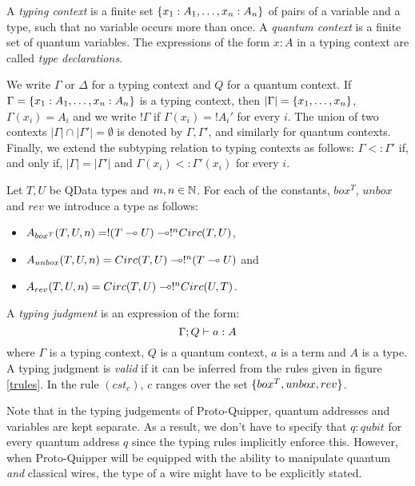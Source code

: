 \documentclass{article}
\begin{document}
\begin{definition}
A \emph{typing context} is a finite set 
$\{x_1:A_1,\ldots,x_n:A_n\}$ of pairs of a variable and 
a type, such that no variable occurs more than once. A 
\emph{quantum context} is a finite set of quantum variables. 
The expressions of the form $x:A$ in a typing context are 
called \emph{type declarations}.	
\end{definition}

We write $\Gamma$ or $\Delta$ for a typing context and $Q$ for 
a quantum context. If $\Gamma =\{x_1:A_1,\ldots,x_n:A_n\}$ is 
a typing context, then $|\Gamma|=\{x_1,\ldots,x_n\}$, 
$\Gamma (x_i)=A_i$ and we write $!\Gamma$ if $\Gamma(x_i)=!A_i'$ 
for every $i$. The union of two contexts 
$|\Gamma|\cap  |\Gamma'|=\emptyset$ is denoted by $\Gamma,\Gamma'$, 
and similarly for quantum contexts. Finally, we extend the subtyping 
relation to typing contexts as follows: $\Gamma <: \Gamma'$ if, and 
only if, $|\Gamma | = |\Gamma'|$ and $\Gamma (x_i)<: \Gamma' (x_i)$ 
for every $i$.

\begin{definition}
Let $T,U$ be QData types and $m,n\in\mathbb{N}$. For each of the constants, 
$box^T$, $unbox$ and $rev$ we introduce a type as follows:
\begin{itemize}
  \item $A_{box^T}(T,U,n)=!(T\multimap U)\multimap !^nCirc(T,U)$,
  \item $A_{unbox}(T,U,n)=Circ(T,U)\multimap !^n(T\multimap U)$ and
  \item $A_{rev}(T,U,n)=Circ(T,U) \multimap !^nCirc(U,T)$.
\end{itemize}
\end{definition}

\begin{definition}
A \emph{typing judgment} is an expression of the form:
\[
\Gamma ; Q \vdash a:A
\] 
where $\Gamma$ is a typing context, $Q$ is a quantum context, 
$a$ is a term and $A$ is a type. A typing judgment is \emph{valid} if 
it can be inferred from the rules given in figure 
\hyperref[trules]{\ref*{trules}}. In the rule $(cst_c)$, 
$c$ ranges over the set $\{box^T, unbox, rev\}$.
\end{definition}

Note that in the typing judgements of Proto-Quipper, quantum addresses 
and variables are kept separate. As a result, we don't have to specify 
that $q:qubit$ for every quantum address $q$ since the typing rules 
implicitly enforce this. However, when Proto-Quipper will be equipped 
with the ability to manipulate quantum \emph{and} classical wires, the 
type of a wire might have to be explicitly stated.
\end{document}

